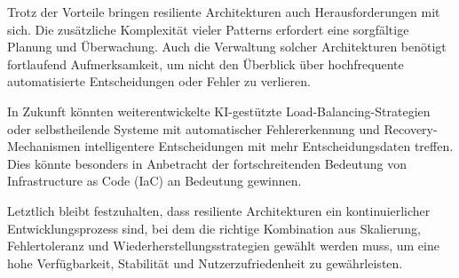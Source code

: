 Trotz der Vorteile bringen resiliente Architekturen auch Herausforderungen mit sich. Die zusätzliche Komplexität vieler Patterns erfordert eine sorgfältige Planung und Überwachung. Auch die Verwaltung solcher Architekturen benötigt fortlaufend Aufmerksamkeit, um nicht den Überblick über hochfrequente automatisierte Entscheidungen oder Fehler zu verlieren.

In Zukunft könnten weiterentwickelte KI-gestützte Load-Balancing-Strategien oder selbstheilende Systeme mit automatischer Fehlererkennung und Recovery-Mechanismen intelligentere Entscheidungen mit mehr Entscheidungsdaten treffen. Dies könnte besonders in Anbetracht der fortschreitenden Bedeutung von Infrastructure as Code (IaC) an Bedeutung gewinnen.

Letztlich bleibt festzuhalten, dass resiliente Architekturen ein kontinuierlicher Entwicklungsprozess sind, bei dem die richtige Kombination aus Skalierung, Fehlertoleranz und Wiederherstellungsstrategien gewählt werden muss, um eine hohe Verfügbarkeit, Stabilität und Nutzerzufriedenheit zu gewährleisten.
